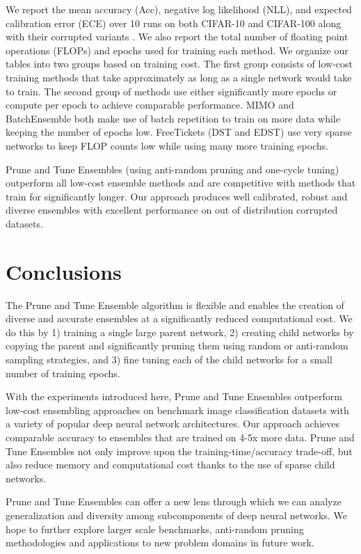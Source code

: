 \documentclass[letterpaper]{article} %
\begin{document}
We report the mean accuracy (Acc), negative log likelihood (NLL), and expected calibration error (ECE) over 10 runs on both CIFAR-10 and CIFAR-100 along with their corrupted variants \cite{nado2021uncertainty, hendrycks2019robustness}. We also report the total number of floating point operations (FLOPs) and epochs used for training each method. We organize our tables into two groups based on training cost. The first group consists of low-cost training methods that take approximately as long as a single network would take to train. The second group of methods use either significantly more epochs or compute per epoch to achieve comparable performance. MIMO and BatchEnsemble both make use of batch repetition to train on more data while keeping the number of epochs low. FreeTickets (DST and EDST) use very sparse networks to keep FLOP counts low while using many more training epochs.

Prune and Tune Ensembles (using anti-random pruning and one-cycle tuning) outperform all low-cost ensemble methods and are competitive with methods that train for significantly longer. Our approach produces well calibrated, robust and diverse ensembles with excellent performance on out of distribution corrupted datasets.

\section{Conclusions}

The Prune and Tune Ensemble algorithm is flexible and enables the creation of diverse and accurate ensembles at a significantly reduced computational cost. We do this by 1) training a single large parent network, 2) creating child networks by copying the parent and significantly pruning them using random or anti-random sampling strategies, and 3) fine tuning each of the child networks for a small number of training epochs.

With the experiments introduced here, Prune and Tune Ensembles outperform low-cost ensembling approaches on benchmark image classification datasets with a variety of popular deep neural network architectures. Our approach achieves comparable accuracy to ensembles that are trained on 4-5x more data. Prune and Tune Ensembles not only improve upon the training-time/accuracy trade-off, but also reduce memory and computational cost thanks to the use of sparse child networks.

Prune and Tune Ensembles can offer a new lens through which we can analyze generalization and diversity among subcomponents of deep neural networks. We hope to further explore larger scale benchmarks, anti-random pruning methodologies and applications to new problem domains in future work.
\end{document}
